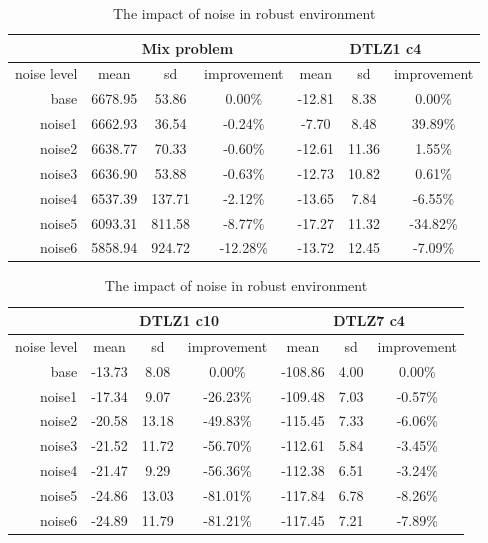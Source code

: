 \begin{table}
  \centering
  \caption{The impact of noise in robust environment}
  \label{t:un_noise_1}
  \begin{tabular}{r c c c c c c}
    & \multicolumn{3}{c}{Mix problem} & \multicolumn{3}{c}{DTLZ1 c4} \\
    \hline
    noise level & mean & sd & improvement & mean & sd & improvement \\
    \hline
    \hline
    base & 6678.95 & 53.86 & 0.00\% & -12.81 & 8.38 & 0.00\% \\
    noise1 & 6662.93 & 36.54 & -0.24\% & -7.70 & 8.48 & 39.89\% \\
    noise2 & 6638.77 & 70.33 & -0.60\% & -12.61 & 11.36 & 1.55\% \\
    noise3 & 6636.90 & 53.88 & -0.63\% & -12.73 & 10.82 & 0.61\% \\
    noise4 & 6537.39 & 137.71 & -2.12\% & -13.65 & 7.84 & -6.55\% \\
    noise5 & 6093.31 & 811.58 & -8.77\% & -17.27 & 11.32 & -34.82\% \\
    noise6 & 5858.94 & 924.72 & -12.28\% & -13.72 & 12.45 & -7.09\% \\
    \hline
  \end{tabular}
\end{table}

 \begin{table}
  \centering
  \caption{The impact of noise in robust environment}
  \label{t:un_noise_2}
  \begin{tabular}{r c c c c c c}
    & \multicolumn{3}{c}{DTLZ1 c10} & \multicolumn{3}{c}{DTLZ7 c4} \\
    \hline
    noise level & mean & sd & improvement & mean & sd & improvement \\
    \hline
    \hline
    base & -13.73 & 8.08 & 0.00\% & -108.86 & 4.00 & 0.00\% \\
    noise1 & -17.34 & 9.07 & -26.23\% & -109.48 & 7.03 & -0.57\% \\
    noise2 & -20.58 & 13.18 & -49.83\% & -115.45 & 7.33 & -6.06\% \\
    noise3 & -21.52 & 11.72 & -56.70\% & -112.61 & 5.84 & -3.45\% \\
    noise4 & -21.47 & 9.29 & -56.36\% & -112.38 & 6.51 & -3.24\% \\
    noise5 & -24.86 & 13.03 & -81.01\% & -117.84 & 6.78 & -8.26\% \\
    noise6 & -24.89 & 11.79 & -81.21\% & -117.45 & 7.21 & -7.89\% \\
    \hline
  \end{tabular}
\end{table}

